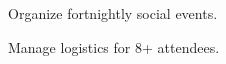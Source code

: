 
\begin{tightemize}
  \item Organize fortnightly social events.
  \item Manage logistics for 8+ attendees.
\end{tightemize}
